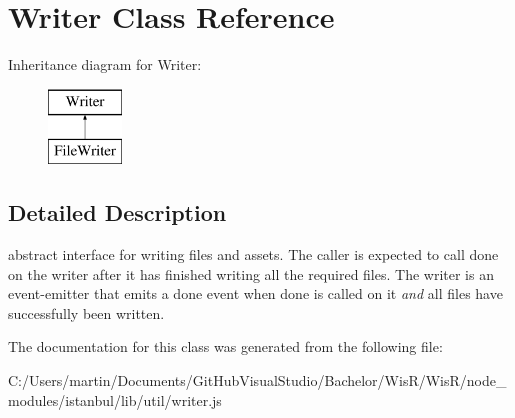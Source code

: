 \hypertarget{class_writer}{}\section{Writer Class Reference}
\label{class_writer}
Inheritance diagram for Writer\+:\begin{figure}[H]
\begin{center}
\leavevmode
\includegraphics[height=2.000000cm]{class_writer}
\end{center}
\end{figure}


\subsection{Detailed Description}
abstract interface for writing files and assets. The caller is expected to call {\ttfamily done} on the writer after it has finished writing all the required files. The writer is an event-\/emitter that emits a {\ttfamily done} event when {\ttfamily done} is called on it {\itshape and} all files have successfully been written.

The documentation for this class was generated from the following file\+:\begin{DoxyCompactItemize}
\item 
C\+:/\+Users/martin/\+Documents/\+Git\+Hub\+Visual\+Studio/\+Bachelor/\+Wis\+R/\+Wis\+R/node\+\_\+modules/istanbul/lib/util/writer.\+js\end{DoxyCompactItemize}
